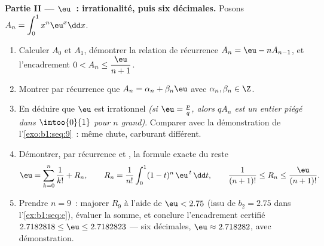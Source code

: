 \begin{problem}
\medskip
\noindent\textbf{Partie II --- $\eu$~: irrationalité, puis six
décimales.} Posons $A_n = \displaystyle\int_0^1 x^n \eu^x \dd x$.
\begin{enumerate}[resume]
  \item Calculer $A_0$ et $A_1$, démontrer la relation de récurrence
        $A_n = \eu - n A_{n-1}$, et l'encadrement $0 < A_n \leq
        \dfrac{\eu}{n+1}$.
  \item Montrer par récurrence que $A_n = \alpha_n + \beta_n \eu$
        avec $\alpha_n, \beta_n \in \Z$.
  \item En déduire que $\eu$ est irrationnel \emph{(si $\eu = \frac
        pq$, alors $q A_n$ est un entier piégé dans
        $\intoo{0}{1}$ pour $n$ grand)}. Comparer avec la
        démonstration de l'\cref{exo:b1:seq:9}~: même chute,
        carburant différent.
  \item Démontrer, par récurrence et , la
        formule exacte du reste
        \[
        \eu = \sum_{k=0}^{n} \frac{1}{k!} + R_n,
        \qquad
        R_n = \frac{1}{n!}\int_0^1 (1 - t)^n\,\eu^{\,t}\,\dd t,
        \qquad
        \frac{1}{(n+1)!} \leq R_n \leq \frac{\eu}{(n+1)!} .
        \]
  \item Prendre $n = 9$~: majorer $R_9$ à l'aide de $\eu < 2.75$
        (issu de $b_2 = 2.75$ dans l'\cref{ex:b1:seq:e}), évaluer la
        somme, et conclure l'encadrement certifié $2.7182818 \leq
        \eu \leq 2.7182823$ --- six décimales, $\eu \approx
        2.718282$, avec démonstration.
\end{enumerate}


\end{problem}
